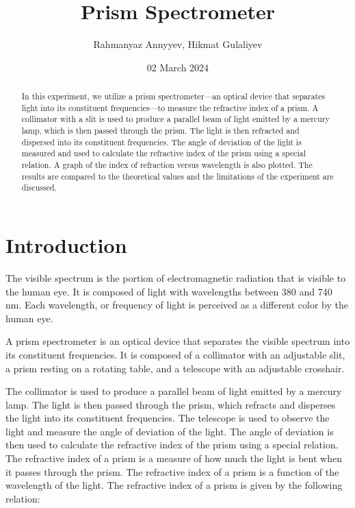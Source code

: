 \documentclass[10pt]{article}
\title{Prism Spectrometer} %
\author{Rahmanyaz Annyyev, Hikmat Gulaliyev} %
\date{02 March 2024} %
\begin{document}
\maketitle

\begin{abstract}
In this experiment, we utilize a prism spectrometer---an optical device that separates light into its constituent frequencies---to measure the refractive index of a prism. A collimator with a slit is used to produce a parallel beam of light emitted by a mercury lamp, which is then passed through the prism. The light is then refracted and dispersed into its constituent frequencies. The angle of deviation of the light is measured and used to calculate the refractive index of the prism using a special relation. A graph of the index of refraction versus wavelength is also plotted. The results are compared to the theoretical values and the limitations of the experiment are discussed.
\end{abstract}

\section{Introduction}
The visible spectrum is the portion of electromagnetic radiation that is visible to the human eye. It is composed of light with wavelengths between 380 and 740 nm. Each wavelength, or frequency of light is perceived as a different color by the human eye. 



A prism spectrometer is an optical device that separates the visible spectrum into its constituent frequencies. It is composed of a collimator with an adjustable slit, a prism resting on a rotating table, and a telescope with an adjustable crosshair. 

The collimator is used to produce a parallel beam of light emitted by a mercury lamp. The light is then passed through the prism, which refracts and disperses the light into its constituent frequencies. The telescope is used to observe the light and measure the angle of deviation of the light. The angle of deviation is then used to calculate the refractive index of the prism using a special relation. The refractive index of a prism is a measure of how much the light is bent when it passes through the prism. The refractive index of a prism is a function of the wavelength of the light. The refractive index of a prism is given by the following relation:
\end{document}
